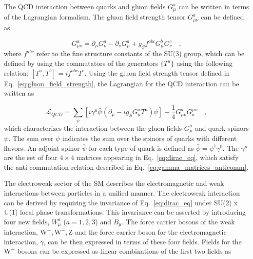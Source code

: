 The QCD interaction between quarks and gluon fields $G_{\mu}^{a}$ can be written in terms of the Lagrangian formalism.
The gluon field strength tensor $G_{\mu\nu}^a$ can be defined as

\begin{equation}
    G_{\mu\nu}^a = \partial_{\mu}G_{\nu}^a - \partial_{\nu}G_{\mu}^a + g_{S} f^{abc} G_{\mu}^{b} G_{\nu}^{c} \quad ,
    \label{eq:gluon_field_strength}
\end{equation}
where $f^{abc}$ refer to the fine structure constants of the SU(3) group, which can be defined by using the
commutators of the generators $\{ T^{a} \}$ using the following relation: 
$[ T^{a}, T^{b} ] = i f^{abc} T^{c}$. 
Using the gluon field strength tensor defined in Eq.~\ref{eq:gluon_field_strength}, 
the Lagrangian for the QCD interaction can be written as


\begin{equation}
    \mathcal{L}_{QCD} = \sum_{\psi} \left[ i \gamma^{\mu} \bar{\psi} \left( \partial_{\mu} - i g_{S} G_{\mu}^{a} T^{a} \right) \psi \right] - \frac{1}{4} G_{\mu\nu}^{a} G^{\mu\nu}_{a} \quad ,
\end{equation}
which characterizes the interaction between the gluon fields $G_{\mu}^{a}$ and quark spinors $\psi$.
The sum over $\psi$ indicates the sum over the spinors of quarks with different flavors.
An adjoint spinor $\bar{\psi}$ for each type of quark is defined as $\bar{\psi} = \psi^{\dag} \gamma^0$.
The $\gamma^{\mu}$ are the set of four $4 \times 4$ matrices appearing in Eq.~\ref{eq:dirac_eq}, which satisfy the
anti-commutation relation described in Eq.~\ref{eq:gamma_matrices_anticomm}. 

The electroweak sector of the SM describes the electromagnetic and weak interactions between particles in a unified manner. The electroweak interaction
can be derived by requiring the invariance of Eq.~\ref{eq:dirac_eq} under SU(2) x U(1) local phase transformations. 
This invariance can be asserted by introducing four
new fields, $W_{\mu}^{a}$ ($a = 1, 2, 3$) and $B_{\mu}$. The force carrier bosons of the weak interaction, $\textrm{W}^{+}, \textrm{W}^{-}, \textrm{Z}$ 
and the force carrier boson 
for the electromagnetic interaction, $\gamma$, can be then expressed in terms of these four fields. Fields for the $\textrm{W}^{\pm}$ bosons can be expressed as
linear combinations of the first two fields as


